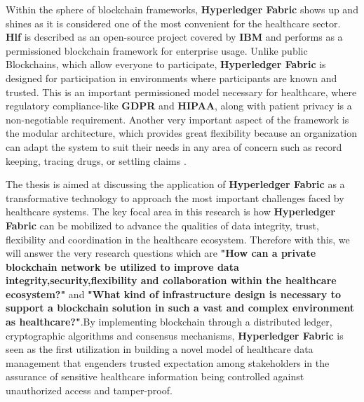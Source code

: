 Within the sphere of blockchain frameworks, \textbf{Hyperledger Fabric}
shows up and shines as it is considered one of the most convenient for the healthcare sector.
\textbf{Hlf} is described as an open-source project covered by \textbf{IBM} 
and performs as a permissioned blockchain framework for enterprise usage.
Unlike public Blockchains, which allow everyone to participate, \textbf{Hyperledger Fabric} is designed 
for participation in environments where participants are known and trusted. This is an important permissioned
model necessary for healthcare, where regulatory compliance-like \textbf{GDPR} and \textbf{HIPAA}, along with 
patient privacy is a non-negotiable requirement. Another very important aspect of the framework is the modular 
architecture, which provides great flexibility because an organization can adapt the system to suit their needs 
in any area of concern such as record keeping, tracing drugs, or settling claims \cite{hyperledger} \cite{hyperledger-hippa-and-gdpr}.

The thesis is aimed at discussing the application of \textbf{Hyperledger Fabric} as a 
transformative technology to approach the most important challenges faced by healthcare systems. 
The key focal area in this research is how \textbf{Hyperledger Fabric} can be mobilized to advance the qualities 
of data integrity, trust, flexibility and coordination in the healthcare ecosystem. Therefore with this, we 
will answer the very research questions which are \textbf{"How can a private blockchain network be utilized to 
improve data integrity,security,flexibility and collaboration within the healthcare ecosystem?"} 
and \textbf{"What kind of infrastructure design is necessary to support a blockchain solution in such a 
vast and complex environment as healthcare?"}.By implementing blockchain through a distributed ledger, 
cryptographic algorithms and consensus mechanisms, \textbf{Hyperledger Fabric} is seen as the first 
utilization in building a novel model of healthcare data management that engenders trusted expectation 
among stakeholders in the assurance of sensitive healthcare information being controlled against 
unauthorized access and tamper-proof.

